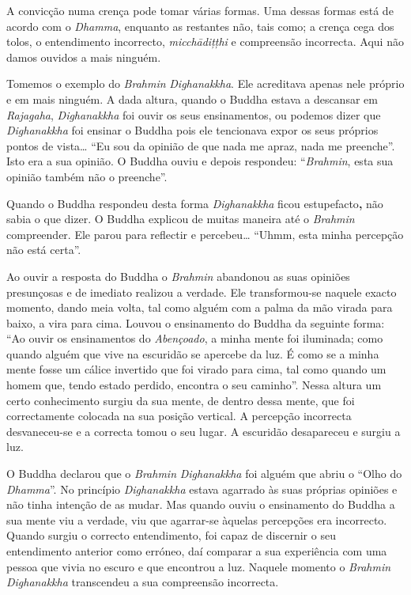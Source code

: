 A convicção numa crença pode tomar várias formas. Uma dessas formas está
de acordo com o \emph{Dhamma}, enquanto as restantes não, tais como; a
crença cega dos tolos, o entendimento incorrecto, \emph{micchādițțhi} e
compreensão incorrecta. Aqui não damos ouvidos a mais ninguém.

Tomemos o exemplo do \emph{Brahmin} \emph{Dighanakkha}. Ele acreditava
apenas nele próprio e em mais ninguém. A dada altura, quando o Buddha
estava a descansar em \emph{Rajagaha}, \emph{Dighanakkha} foi ouvir os
seus ensinamentos, ou podemos dizer que \emph{Dighanakkha} foi ensinar o
Buddha pois ele tencionava expor os seus próprios pontos de
vista\ldots{} ``Eu sou da opinião de que nada me apraz, nada me
preenche''. Isto era a sua opinião. O Buddha ouviu e depois respondeu:
``\emph{Brahmin}, esta sua opinião também não o preenche''.

Quando o Buddha respondeu desta forma \emph{Dighanakkha} ficou
estupefacto\textbf{,} não sabia o que dizer. O Buddha explicou de muitas
maneira até o \emph{Brahmin} compreender. Ele parou para reflectir e
percebeu\ldots{} ``Uhmm, esta minha percepção não está certa''.

Ao ouvir a resposta do Buddha o \emph{Brahmin} abandonou as suas
opiniões presunçosas e de imediato realizou a verdade. Ele
transformou-se naquele exacto momento, dando meia volta, tal como alguém
com a palma da mão virada para baixo, a vira para cima. Louvou o
ensinamento do Buddha da seguinte forma: ``Ao ouvir os ensinamentos do
\emph{Abençoado}, a minha mente foi iluminada; como quando alguém que
vive na escuridão se apercebe da luz. É como se a minha mente fosse um
cálice invertido que foi virado para cima, tal como quando um homem que,
tendo estado perdido, encontra o seu caminho''. Nessa altura um certo
conhecimento surgiu da sua mente, de dentro dessa mente, que foi
correctamente colocada na sua posição vertical. A percepção incorrecta
desvaneceu-se e a correcta tomou o seu lugar. A escuridão desapareceu e
surgiu a luz.

O Buddha declarou que o \emph{Brahmin} \emph{Dighanakkha} foi alguém que
abriu o ``Olho do \emph{Dhamma}''. No princípio \emph{Dighanakkha}
estava agarrado às suas próprias opiniões e não tinha intenção de as
mudar. Mas quando ouviu o ensinamento do Buddha a sua mente viu a
verdade, viu que agarrar-se àquelas percepções era incorrecto. Quando
surgiu o correcto entendimento, foi capaz de discernir o seu
entendimento anterior como erróneo, daí comparar a sua experiência com
uma pessoa que vivia no escuro e que encontrou a luz. Naquele momento o
\emph{Brahmin} \emph{Dighanakkha} transcendeu a sua compreensão
incorrecta.

